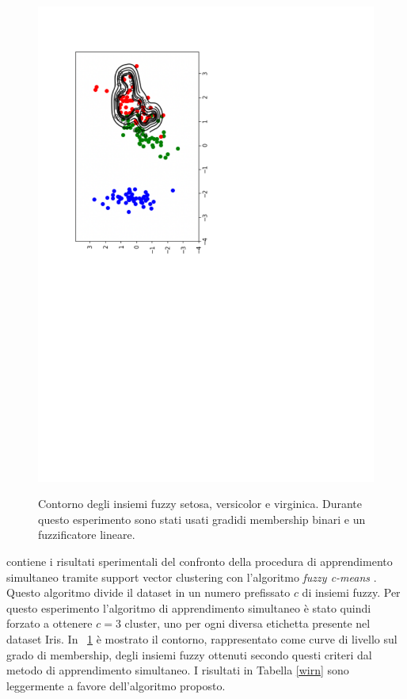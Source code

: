 \documentclass [11pt,a4paper,twoside,openright] {book}
\begin{document}
\begin{figure}[!t]
          {\includegraphics[scale=.35]{figure/wirnvirginica.pdf}}
          \caption{Contorno degli insiemi fuzzy setosa, versicolor e virginica. Durante questo esperimento sono stati usati gradidi membership binari e un fuzzificatore lineare.\label{fwirn}}
\end{figure}
contiene i risultati sperimentali del confronto della procedura di apprendimento simultaneo tramite support vector clustering con l'algoritmo \textit{fuzzy c-means} \cite{bezdek1984fcm}. Questo algoritmo divide il dataset in un numero prefissato $c$ di insiemi fuzzy. Per questo esperimento l'algoritmo di apprendimento simultaneo è stato quindi forzato a ottenere $c=3$ cluster, uno per ogni diversa etichetta presente nel dataset Iris. In \figurename~\ref{fwirn} è mostrato il contorno, rappresentato come curve di livello sul grado di membership, degli insiemi fuzzy ottenuti secondo questi criteri dal metodo di apprendimento simultaneo. I risultati in Tabella \ref{wirn} sono leggermente a favore dell'algoritmo proposto.\\\\
\end{document}
